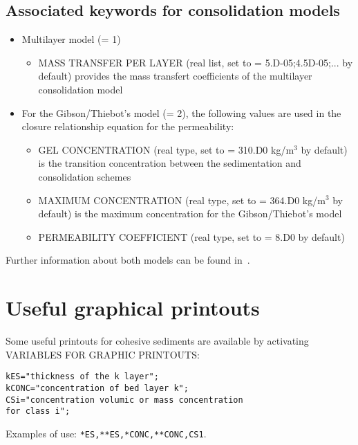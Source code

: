 \subsection{Associated keywords for consolidation models}
\begin{itemize}
\item Multilayer model ({\ttfamily = 1})
\begin{itemize}
\item {\ttfamily MASS TRANSFER PER LAYER} (real list, set to {\ttfamily = 5.D-05;4.5D-05;...} by default) provides the mass transfert coefficients of the multilayer consolidation model %
\end{itemize} 
\item For the Gibson/Thiebot's model ({\ttfamily = 2}), the following values are used in the closure relationship equation for the permeability:
\begin{itemize}
\item {\ttfamily GEL CONCENTRATION} (real type, set to {\ttfamily = 310.D0} kg/m$^3$ by default) is the transition concentration between the sedimentation and consolidation schemes
\item {\ttfamily MAXIMUM CONCENTRATION} (real type, set to {\ttfamily = 364.D0} kg/m$^3$ by default) is the maximum concentration for the Gibson/Thiebot's model
\item {\ttfamily PERMEABILITY COEFFICIENT} (real type, set to {\ttfamily = 8.D0} by default) %
\end{itemize}
\end{itemize}

Further information about both models can be found in~\cite{Lan12}.

\section{Useful graphical printouts}
Some useful printouts for cohesive sediments are available by activating {\ttfamily VARIABLES FOR GRAPHIC PRINTOUTS}:
\begin{lstlisting}[frame=trBL]  
kES="thickness of the k layer";
kCONC="concentration of bed layer k";
CSi="concentration volumic or mass concentration 
for class i";
\end{lstlisting}  
Examples of use: \texttt{*ES,**ES,*CONC,**CONC,CS1}.
